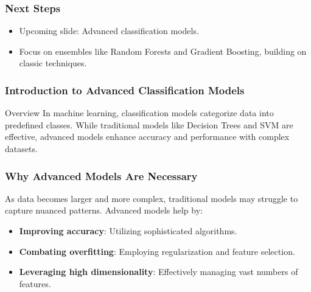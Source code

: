 \documentclass[aspectratio=169]{beamer}
\begin{document}
\begin{frame}[fragile]
    \frametitle{Next Steps}
    \begin{itemize}
        \item Upcoming slide: Advanced classification models.
        \item Focus on ensembles like Random Forests and Gradient Boosting, building on classic techniques.
    \end{itemize}
\end{frame}

\begin{frame}[fragile]
    \frametitle{Introduction to Advanced Classification Models}
    \begin{block}{Overview}
    In machine learning, classification models categorize data into predefined classes. While traditional models like Decision Trees and SVM are effective, advanced models enhance accuracy and performance with complex datasets.
    \end{block}
\end{frame}

\begin{frame}[fragile]
    \frametitle{Why Advanced Models Are Necessary}
    As data becomes larger and more complex, traditional models may struggle to capture nuanced patterns. Advanced models help by:
    \begin{itemize}
        \item \textbf{Improving accuracy}: Utilizing sophisticated algorithms.
        \item \textbf{Combating overfitting}: Employing regularization and feature selection.
        \item \textbf{Leveraging high dimensionality}: Effectively managing vast numbers of features.
    \end{itemize}
\end{frame}
\end{document}
